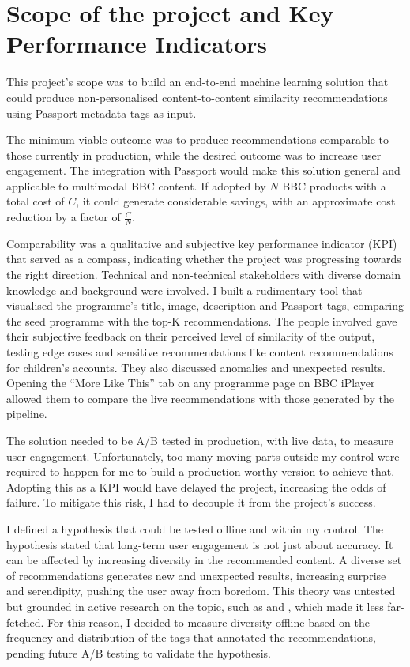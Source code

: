 
\section{Scope of the project and Key Performance Indicators}

This project's scope was to build an end-to-end machine learning solution that could produce non-personalised content-to-content similarity recommendations using Passport metadata tags as input.

The minimum viable outcome was to produce recommendations comparable to those currently in production,
while the desired outcome was to increase user engagement.
The integration with Passport would make this solution general and applicable to multimodal BBC content.
If adopted by $N$ BBC products with a total cost of $C$,
it could generate considerable savings, with an approximate cost reduction by a factor of $\frac{C}{N}$.

Comparability was a qualitative and subjective key performance indicator (KPI) that served as a compass,
indicating whether the project was progressing towards the right direction.
Technical and non-technical stakeholders with diverse domain knowledge and background were involved.
I built a rudimentary tool that visualised the programme's title, image, description and Passport tags,
comparing the seed programme with the top-K recommendations.
The people involved gave their subjective feedback on their perceived level of similarity of the output,
testing edge cases and sensitive recommendations like content recommendations for children's accounts.
They also discussed anomalies and unexpected results.
Opening the ``More Like This'' tab on any programme page on BBC iPlayer allowed them to compare the live recommendations
with those generated by the pipeline.

The solution needed to be A/B tested in production, with live data, to measure user engagement.
Unfortunately, too many moving parts outside my control were required to happen for me to build a
production-worthy version to achieve that.
Adopting this as a KPI would have delayed the project, increasing the odds of failure.
To mitigate this risk, I had to decouple it from the project's success.

I defined a hypothesis that could be tested offline and within my control.
The hypothesis stated that long-term user engagement is not just about accuracy. It can be affected by increasing diversity in the recommended content.
A diverse set of recommendations generates new and unexpected results, increasing surprise and serendipity, pushing the user away from boredom.
This theory was untested but grounded in active research on the topic, such as \cite{Kaminskas2016DiversitySN} and
\cite{duricic2023beyondaccuracyreviewdiversityserendipity}, which made it less far-fetched.
For this reason, I decided to measure diversity offline based on the frequency and distribution of the tags that annotated the recommendations,
pending future A/B testing to validate the hypothesis.
